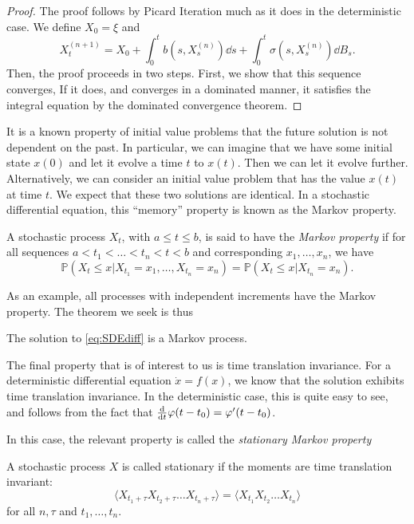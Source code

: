 \documentclass[prb,12pt]{revtex4-2}
\theoremstyle{definition}
\theoremstyle{definition}
\theoremstyle{definition}
\begin{document}
\begin{proof}
	The proof follows by Picard Iteration much as it does in the deterministic case. We define $X_0=\xi$ and
	\[
	X_t^{(n+1)}=X_0+\int_0^t b(s, X_s^{(n)})\dd{s}+\int_0^t \sigma(s, X_s^{(n)})\dd{B_s}
	.\] 
	Then, the proof proceeds in two steps. First, we show that this sequence converges, If it does, and converges in a dominated manner, it satisfies the integral equation by the dominated convergence theorem. 
\end{proof}
It is a known property of initial value problems that the future solution is not dependent on the past. In particular, we can imagine that we have some initial state $x(0)$ and let it evolve a time $t$ to $x(t)$. Then we can let it evolve further. Alternatively, we can consider an initial value problem that has the value $x(t)$ at time $t$. We expect that these two solutions are identical. In a stochastic differential equation, this ``memory'' property is known as the Markov property. 
\begin{Definition}
	A stochastic process $X_t$, with $a\le t \le b$, is said to have the \emph{Markov property} if for all sequences $a < t_1 < \dots < t_n < t < b$ and corresponding $x_1, \dots, x_n$, we have
	\[
	\mathbb{P}(X_t\le x|X_{t_1}=x_1, \dots, X_{t_n}=x_n) = \mathbb{P}(X_t\le x|X_{t_n}=x_n)
	.\] 
\end{Definition}
As an example, all processes with independent increments have the Markov property. The theorem we seek is thus

\begin{Theorem}
	The solution to \eqref{eq:SDEdiff} is a Markov process.
\end{Theorem}

The final property that is of interest to us is time translation invariance. For a deterministic differential equation $\dot{x} = f(x)$, we know that the solution exhibits time translation invariance. In the deterministic case, this is quite easy to see, and follows from the fact that $\dv{t}\varphi(t - t_0) = \varphi'(t-t_0)$. 

In this case, the relevant property is called the \emph{stationary Markov property}
\begin{Definition}
	A stochastic process $X$ is called stationary if the moments are time translation invariant:
	\[
	\langle X_{t_1+\tau}X_{t_2+\tau}\dots X_{t_n+\tau}\rangle = \langle X_{t_1}X_{t_2}\dots X_{t_n}\rangle
	\]
	for all $n,\tau$ and $t_1, \dots, t_n$.
\end{Definition}
\end{document}
